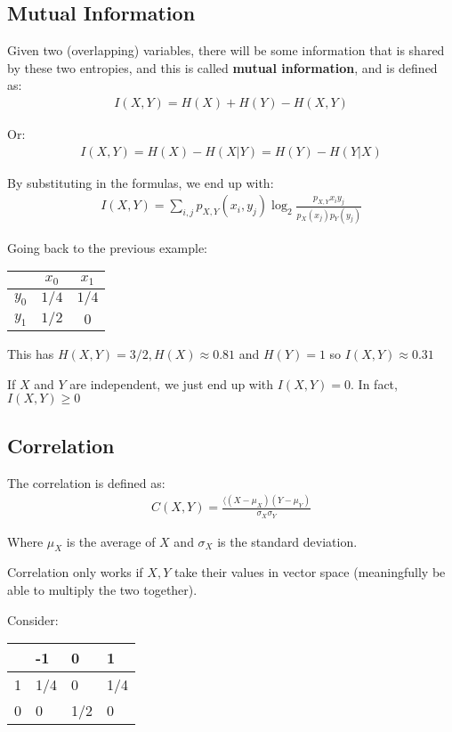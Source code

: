 \documentclass[11pt,a4paper,titlepage,dvipsnames,cmyk]{scrartcl}
\begin{document}
\subsection{Mutual Information}
Given two (overlapping) variables, there will be some information that is shared by these two entropies, and this is called \textbf{mutual information}, and is defined as:
\begin{align*}
I(X,Y) = H(X) + H(Y) - H(X,Y)
\end{align*}

Or:
\begin{align*}
I(X,Y) = H(X) - H(X|Y) = H(Y) - H(Y|X)
\end{align*}

By substituting in the formulas, we end up with:
\begin{align*}
I(X,Y) = \sum_{i,j} p_{X,Y} (x_i, y_j) \log_2 \frac{p_{X,Y}x_i y_j}{p_X (x_j)p_Y(y_j)}
\end{align*}

Going back to the previous example:
\begin{center}
    \begin{tabular}{c|cc}
        & $x_0$ & $x_1$ \\ \midrule
        $y_0$ & $1/4$ & $1/4$ \\
        $y_1$ & $1/2$ & $0$
    \end{tabular}
\end{center}

This has $H(X,Y) = 3/2, H(X) \approx 0.81$ and $H(Y) = 1$ so $I(X,Y) \approx 0.31$

If $X$ and $Y$ are independent, we just end up with $I(X,Y) = 0$. In fact, $I(X,Y) \ge 0$

\subsection{Correlation}
The correlation is defined as:
\begin{align*}
C(X,Y) = \frac{\langle(X-\mu_X)(Y-\mu_Y)}{\sigma_X \sigma_Y}
\end{align*}

Where $\mu_X$ is the average of $X$ and $\sigma_X$ is the standard deviation.

Correlation only works if $X,Y$ take their values in vector space (meaningfully be able to multiply the two together).

Consider:
\begin{center}
    \begin{tabular}{l|lll}
        & -1 & 0 & 1 \\
        \midrule
        1 & 1/4 & 0 & 1/4 \\
        0 & 0 & 1/2 & 0
    \end{tabular}
\end{center}
\end{document}
